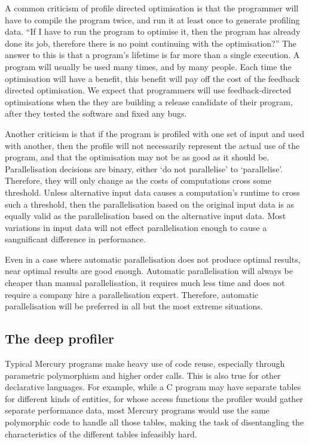 
A common criticism of profile directed optimisation is that the programmer will
have to compile the program twice,
and run it at least once to generate profiling data.
``If I have to run the program to optimise it, then the program has
already done its job,
therefore there is no point continuing with the optimisation?''
The answer to this is that a program's lifetime is far more than a
single execution.
A program will usually be used many times, and by many people.
Each time the optimisation will have a benefit,
this benefit will pay off the cost of the feedback directed optimisation.
We expect that programmers will use feedback-directed optimisations when the
they are building a release candidate of their program,
after they tested the software and fixed any bugs.

Another criticism is that if the program is profiled with one set of input and
used with another,
then the profile will not necessarily represent the actual use
of the program,
and that the optimisation may not be as good as it should be.
Parallelisation decisions are binary,
either `do not parallelise' to `parallelise'.
Therefore,
they will only change as the costs of computations cross some threshold.
Unless alternative input data causes a computation's runtime to cross such a
threshold,
then the parallelisation based on the original input data is 
as equally valid as the parallelisation based on the alternative input data.
Most variations in input data will not  
effect parallelisation enough to cause a sangnificant difference in performance.

Even in a case where automatic parallelisation does not produce optimal
results,
near optimal results are good enough.
Automatic parallelisation will always be cheaper than manual
parallelisation,
it requires much less time and does not require a company hire a
parallelisation expert.
Therefore, automatic parallelisation will be preferred in all but the most
extreme situations.

\subsection{The deep profiler}
\label{sec:backgnd_deep}

Typical Mercury programs make heavy use of code reuse,
especially through parametric polymorphism and higher order calls.
This is also true for other declarative languages.
For example, while a C program may have
separate tables for different kinds of entities,
for whose access functions
the profiler would gather separate performance data,
most Mercury programs would use
the same polymorphic code to handle all those tables,
making the task of disentangling the characteristics of the different tables
infeasibly hard.

